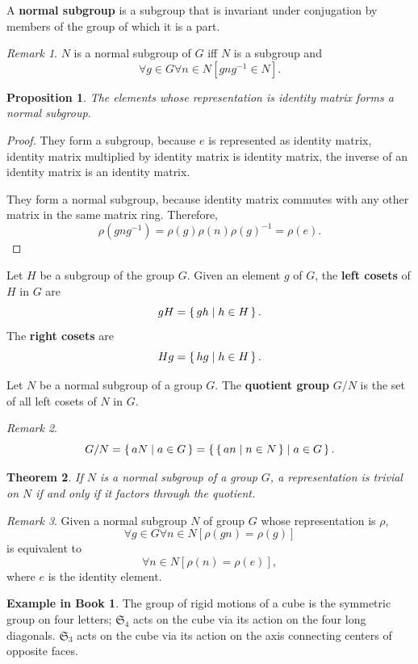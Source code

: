 \documentclass[12pt, letterpaper]{article}
\newtheorem{prop}{Proposition}[section]
\newtheorem{thm}[prop]{Theorem}
\theoremstyle{definition}
\theoremstyle{remark}
\newtheorem*{rem*}{Remark}
\theoremstyle{definition}
\newtheorem{exam}[exe]{Example in Book}
\theoremstyle{plain}
\numberwithin{equation}{section}
\begin{document}
	\begin{def*}
		A \textbf{normal subgroup} is a subgroup that is invariant under conjugation by members of the group of which it is a part.
	\end{def*}
	\begin{rem*}
		$N$ is a normal subgroup of $G$ iff $N$ is a subgroup and \[ \forall g \in G \forall n \in N[gng^{-1}\in N].\]
	\end{rem*}
	\begin{prop}
		The elements whose representation is identity matrix forms a normal subgroup.
	\end{prop}
	\begin{proof}
		They form a subgroup, because $e$ is represented as identity matrix,
		identity matrix multiplied by identity matrix is identity matrix,
		the inverse of an identity matrix is an identity matrix.
		
		They form a normal subgroup, because identity matrix commutes with any other matrix
		in the same matrix ring. Therefore,
		\[\rho(gng^{-1})=\rho(g)\rho(n)\rho(g)^{-1}=\rho(e). \]
	\end{proof}
	\begin{def*}[coset]
		Let $H$ be a subgroup of the group $G$.
		Given an element $g$ of $G$, the \textbf{left cosets} of $H$ in $G$ are
		\[gH = \set{gh | h \in H}.\]
		The \textbf{right cosets} are
		\[Hg = \set{hg | h \in H}.\]
	\end{def*}
	\begin{def*}
		Let $N$ be a normal subgroup of a group $G$.
		The \textbf{quotient group} $G/N$ is the set of all left cosets of $N$ in $G$.
	\end{def*}
	\begin{rem*}
		\[G/N = \set{aN|a\in G}= \set{ \set{an | n\in N}| a\in G}. \]
	\end{rem*}
	\begin{thm}
		If $N$ is a normal subgroup of a group $G$, a representation is trivial on $N$ if and 
		only if it factors through the quotient.
	\end{thm}
	\begin{rem*}
		Given a normal subgroup $N$ of group $G$ whose representation is $\rho$,
		\[\forall g \in G\forall n \in N[\rho(gn)=\rho(g)]\]
		is equivalent to
		\[\forall n\in N[\rho(n)=\rho(e)],\]
		where $e$ is the identity element.
	\end{rem*}

	\begin{exam}
		The group of rigid motions of a cube is the 
		symmetric group on four letters; $\mathfrak{S}_4$ acts on the cube via its action on the four 
		long diagonals.
		$\mathfrak{S}_3$ acts on the cube via its action on the axis connecting centers of opposite faces.
	\end{exam}
\end{document}
